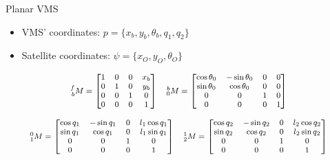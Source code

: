 \begin{frame}{Planar VMS}
    \begin{itemize}
        \item VMS' coordinates: $p=\{x_b,y_b,\theta_b,q_1,q_2\}$
        \item Satellite coordinates: $  \psi=\{x_O,y_O,\theta_O\}$
    \end{itemize}
    \vspace{0.5cm}
        \begin{equation}
            \begin{footnotesize}
            \begin{array}{c}
              \prescript{f}{b}{M}=\begin{bmatrix}
              1&0&0&x_b\\
              0&1&0&y_b\\
              0&0&1&0\\
              0&0&0&1
              \end{bmatrix}\quad
              \prescript{b}{0}{M}=\begin{bmatrix}
                \cos{\theta_0}&-\sin{\theta_0}&0&0\\
                \sin{\theta_0}&\cos{\theta_0}&0&0\\
                0&0&1&0\\
                0&0&0&1
              \end{bmatrix}\\ \\
              \prescript{0}{1}{M}=\begin{bmatrix}
                \cos{q_1}&-\sin{q_1}&0&l_1\cos{q_1}\\
                \sin{q_1}&\cos{q_1}&0&l_1\sin{q_1}\\
                0&0&1&0\\
                0&0&0&1
              \end{bmatrix}\quad
              \prescript{1}{2}{M}=\begin{bmatrix}
                \cos{q_2}&-\sin{q_2}&0&l_2\cos{q_2}\\
                \sin{q_2}&\cos{q_2}&0&l_2\sin{q_2}\\
                0&0&1&0\\
                0&0&0&1
              \end{bmatrix}
            \end{array}
            \end{footnotesize}
          \end{equation}
\end{frame}

